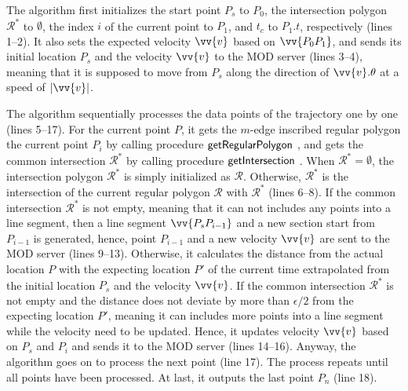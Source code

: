 The algorithm first initializes the start point $P_s$ to $P_0$,  the intersection polygon $\mathcal{R}^*$ to $\emptyset$, the index $i$ of the current point to $P_1$, and $t_c$ to $P_1.t$, respectively (lines 1--2). It also sets the expected velocity $\vv{v}$ based on $\vv{P_0P_1}$, and sends its initial location $P_s$ and the velocity $\vv{v}$ to the MOD server (lines 3--4), meaning that it is supposed to move from $P_s$ along the direction of $\vv{v}.\theta$ at a speed of $|\vv{v}|$.

The algorithm sequentially processes the data points of the trajectory one by one (lines 5--17). 
For the current point $P$, it gets the $m$-edge inscribed regular polygon \wrt the current point $P_i$ by calling procedure ${\mathsf{getRegularPolygon}}$ \cite{Lin:Cised}, and gets the common intersection $\mathcal{R}^*$ by calling procedure ${\mathsf{getIntersection}}$ \cite{Lin:Cised}. When $\mathcal{R}^* = \emptyset$, the intersection polygon $\mathcal{R}^*$ is simply initialized as $\mathcal{R}$. Otherwise, $\mathcal{R}^*$ is  the intersection of the current regular polygon $\mathcal{R}$ with $\mathcal{R}^*$ (lines 6--8). 
%
If the common intersection $\mathcal{R}^*$ is not empty, meaning that it can not includes any points into a line segment, then a line segment $\vv{P_sP_{i-1}}$ and a new section start from  $P_{i-1}$ is generated, hence, point $P_{i-1}$ and a new velocity $\vv{v}$ are sent to the MOD server (lines 9--13).
%
Otherwise, it calculates the distance from the actual location $P$ with the expecting location $P'$ of the current time extrapolated from the initial location $P_s$ and the velocity $\vv{v}$. 
If the common intersection $\mathcal{R}^*$ is not empty and the distance does not deviate by more than $\epsilon/2$ from the expecting location $P'$, meaning it can includes more points into a line segment while the velocity need to be updated. Hence, it updates velocity $\vv{v}$ based on $P_s$ and $P_i$ and sends it to the MOD server (lines 14--16). 
%
Anyway, the algorithm goes on to process the next point (line 17).
%
The process repeats until all points have been processed.
At last, it outputs the last point $P_{n}$ (line 18).





